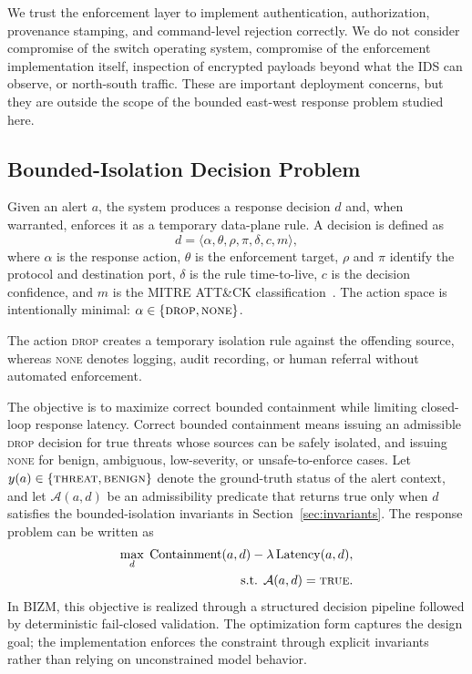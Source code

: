 \documentclass[final,5p]{elsarticle}
\begin{document}
We trust the enforcement layer to implement authentication, authorization, provenance stamping, and command-level rejection correctly. We do not consider compromise of the switch operating system, compromise of the enforcement implementation itself, inspection of encrypted payloads beyond what the IDS can observe, or north-south traffic. These are important deployment concerns, but they are outside the scope of the bounded east-west response problem studied here.

\subsection{Bounded-Isolation Decision Problem}
\label{sec:problem_statement}

Given an alert $a$, the system produces a response decision $d$ and, when warranted, enforces it as a temporary data-plane rule. A decision is defined as
\[
d = \langle \alpha,\theta,\rho,\pi,\delta,c,m\rangle ,
\]
where $\alpha$ is the response action, $\theta$ is the enforcement target, $\rho$ and $\pi$ identify the protocol and destination port, $\delta$ is the rule time-to-live, $c$ is the decision confidence, and $m$ is the MITRE ATT\&CK classification~\cite{strom2018mitre,mitre2026attack}. The action space is intentionally minimal: $\alpha \in \{\textsc{drop},\textsc{none}\}$.

The action \textsc{drop} creates a temporary isolation rule against the offending source, whereas \textsc{none} denotes logging, audit recording, or human referral without automated enforcement.

The objective is to maximize correct bounded containment while limiting closed-loop response latency. Correct bounded containment means issuing an admissible \textsc{drop} decision for true threats whose sources can be safely isolated, and issuing \textsc{none} for benign, ambiguous, low-severity, or unsafe-to-enforce cases. Let $y(a)\in\{\textsc{threat},\textsc{benign}\}$ denote the ground-truth status of the alert context, and let $\mathcal{A}(a,d)$ be an admissibility predicate that returns true only when $d$ satisfies the bounded-isolation invariants in Section~\ref{sec:invariants}. The response problem can be written as
\begin{equation}
\begin{aligned}
\max_d \; \mathrm{Containment}(a,d)-\lambda\,\mathrm{Latency}(a,d),
\\
\text{s.t. } \mathcal{A}(a,d)=\textsc{true}.
\end{aligned}
\label{eq:containment}
\end{equation}
In BIZM, this objective is realized through a structured decision pipeline followed by deterministic fail-closed validation. The optimization form captures the design goal; the implementation enforces the constraint through explicit invariants rather than relying on unconstrained model behavior.
\end{document}
